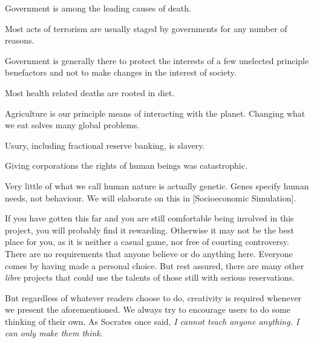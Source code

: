 
Government is among the leading causes of death.


Most acts of terrorism are usually staged by governments for any number of reasons.\footnotecite[northwoods]\footnotecite[harrit2009]


Government is generally there to protect the interests of a few unelected principle benefactors and not to make changes in the interest of society.


Most health related deaths are rooted in diet.


Agriculture is our principle means of interacting with the planet. Changing what we eat solves many global problems.


Usury, including fractional reserve banking, is slavery.


Giving corporations the rights of human beings was catastrophic.


Very little of what we call human nature is actually genetic. Genes specify human needs, not behaviour. We will elaborate on this in [Socioeconomic Simulation].
\stopitemize

If you have gotten this far and you are still comfortable being involved in this project, you will probably find it rewarding. Otherwise it may not be the best place for you, as it is neither a casual game, nor free of courting controversy. There are no requirements that anyone believe or do anything here. Everyone comes by having made a personal choice. But rest assured, there are many other {\it libre} projects that could use the talents of those still with serious reservations.

But regardless of whatever readers choose to do, creativity is required whenever we present the aforementioned. We always try to encourage users to do some thinking of their own. As Socrates once said, {\it I cannot teach anyone anything. I can only make them think}.

\StopChapter


